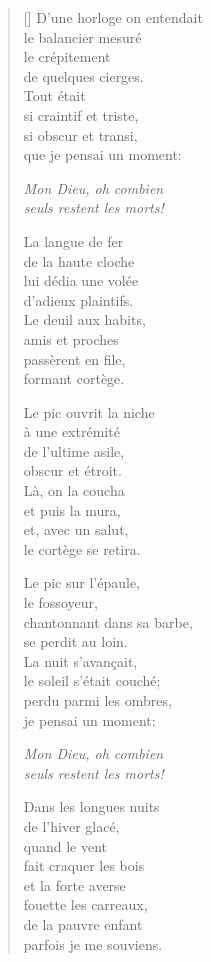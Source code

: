 \documentclass[a4paper,12pt]{book}
\begin{document}
\begin{verse}[\versewidth]
  D'une horloge on entendait \\
  le balancier mesuré \\
  le crépitement \\
  de quelques cierges. \\
  Tout était \\
  si craintif et triste, \\
  si obscur et transi, \\
  que je pensai un moment:

  \emph{Mon Dieu, oh combien \\
  seuls restent les morts!}

  La langue de fer \\
  de la haute cloche \\
  lui dédia une volée \\
  d'adieux plaintifs. \\
  Le deuil aux habits, \\
  amis et proches \\
  passèrent en file, \\
  formant cortège.

  Le pic ouvrit la niche \\
  à une extrémité \\
  de l'ultime asile, \\
  obscur et étroit. \\
  Là, on la coucha \\
  et puis la mura, \\
  et, avec un salut, \\
  le cortège se retira.

  Le pic sur l'épaule, \\
  le fossoyeur, \\
  chantonnant dans sa barbe, \\
  se perdit au loin. \\
  La nuit s'avançait, \\
  le soleil s'était couché; \\
  perdu parmi les ombres, \\
  je pensai un moment:

  \emph{Mon Dieu, oh combien \\
  seuls restent les morts!}

  Dans les longues nuits \\
  de l'hiver glacé, \\
  quand le vent \\
  fait craquer les bois \\
  et la forte averse \\
  fouette les carreaux, \\
  de la pauvre enfant \\
  parfois je me souviens.


\end{verse}
\end{document}
